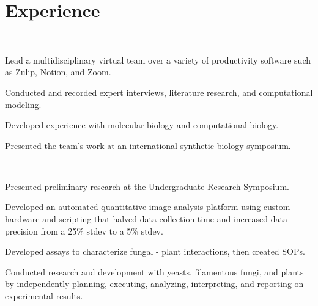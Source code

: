 \documentclass[]{forrest-resume-interfont}
\begin{document}

\section{\protect{} Experience}
\\

\begin{tightemize}
    \item Lead a multidisciplinary virtual team over a variety of productivity software such as Zulip, Notion, and Zoom.
    \item Conducted and recorded expert interviews, literature research, and computational modeling.
    \item Developed experience with molecular biology and computational biology.
    \item Presented the team's work at an international synthetic biology symposium.
\end{tightemize}


\sectionsep


\\

\begin{tightemize}
    \item Presented preliminary research at the Undergraduate Research Symposium.
    \item Developed an automated quantitative image analysis platform using custom hardware and scripting that halved data collection time and increased data precision from a 25\% stdev to a 5\% stdev.
    \item Developed assays to characterize fungal - plant interactions, then created SOPs.
    \item Conducted research and development with yeasts, filamentous fungi, and plants by independently planning, executing, analyzing, interpreting, and reporting on experimental results. 
\end{tightemize}


\end{document}
